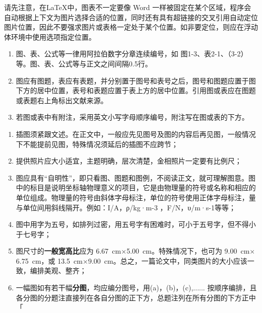 

请先注意，在\LaTeX 中，图表不一定要像 Word 一样被固定在某个区域，程序会自动根据上下文为图片选择合适的位置，同时还有具有超链接的交叉引用自动定位图片位置，因此不要强求图片或表格一定处于某个位置。如非要定位，则应在浮动体环境中使用\clist{[H]}选项指定位置。

\begin{tcolorbox}[colback=red!5!white,colframe=red!75!black]
  \begin{enumerate}[leftmargin=0.5cm]
    \item 图、表、公式等一律用阿拉伯数字分章连续编号，如 图1-3、表2-1、（3-2）等。图、表、公式等与正文之间间隔0.5行。

    \item 图应有图题，表应有表题，并分别置于图号和表号之后，图号和图题应置于图下方的居中位置，表号和表题应置于表上方的居中位置。引用图或表应在图题或表题右上角标出文献来源。

    \item 若图或表中有附注，采用英文小写字母顺序编号，附注写在图或表的下方。
  \end{enumerate}
\end{tcolorbox}



\begin{tcolorbox}[colback=red!5!white,colframe=red!75!black]
  \begin{enumerate}[leftmargin=0.5cm]
    \item 插图须紧跟文述。在正文中，一般应先见图号及图的内容后再见图，一般情况下不能提前见图，特殊情况须延后的插图不应跨节；
    \item 提供照片应大小适宜，主题明确，层次清楚，金相照片一定要有比例尺；
    \item 图应具有“自明性”，即只看图、图题和图例，不阅读正文，就可理解图意。图中的标目是说明坐标轴物理意义的项目，它是由物理量的符号或名称和相应的单位组成。物理量的符号由斜体字母标注，单位的符号使用正体字母标注，量与单位间用斜线隔开。例如：I/A，ρ/kg·m-3 ，F/N，υ/m·s-1等等；
    \item 图中用字为五号，如排列过密，用五号字有困难时，可小于五号字，但不得小于七号字；
    \item 图尺寸的\textbf{一般宽高比}应为 \SI{6.67}{cm}$\times$\SI{5.00}{cm}。特殊情况下，也可为 \SI{9.00}{cm}$\times$\SI{6.75}{cm}，或 \SI{13.5}{cm}$\times$\SI{9.00}{cm}。总之，一篇论文中，同类图片的大小应该一致，编排美观、整齐；
    \item 一幅图如有若干幅\textbf{分图}，均应编分图号，用(a)，(b)，(c),...... 按顺序编排，且各分图的分题注直接列在各自分图的正下方，总题注列在所有分图的下方正中「
  \end{enumerate}
\end{tcolorbox}

